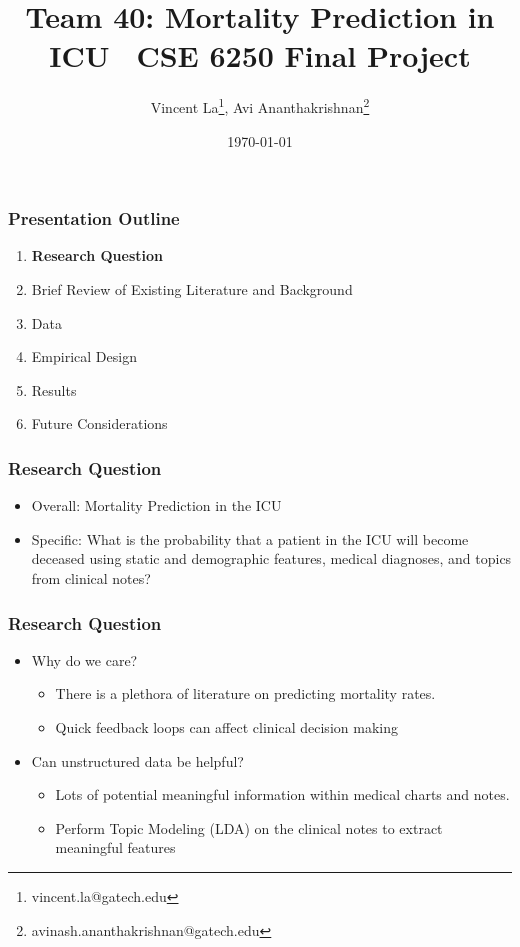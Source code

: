 \documentclass{beamer}
\title{Team 40: Mortality Prediction in ICU \ \newline CSE 6250 Final Project}
\author{Vincent La\footnote{vincent.la@gatech.edu}, Avi Ananthakrishnan\footnote{avinash.ananthakrishnan@gatech.edu}}
\institute{Georgia Tech}
\date{\today}
\begin{document}
\maketitle

\begin{frame}
\label{Presentation Outline 1}
\frametitle{Presentation Outline}
\begin{enumerate}
\item[1.] \textbf{Research Question}
\newline
\item[2.] Brief Review of Existing Literature and Background
\newline
\item[3.] Data
\newline
\item[4.] Empirical Design
\newline
\item[5.] Results
\newline
\item[6.] Future Considerations
\end{enumerate}
\end{frame}

\begin{frame}
\label{Research Question}
\frametitle{Research Question}
\begin{itemize}
	\item Overall: Mortality Prediction in the ICU
	\newline
	\item Specific: What is the probability that a patient in the ICU will become deceased using static and demographic features, medical diagnoses, and topics from clinical notes?
\end{itemize}
\end{frame}

\begin{frame} 
\frametitle{Research Question}
\begin{itemize}
	\item Why do we care?
	\newline
		\begin{itemize}
			\item There is a plethora of literature on predicting mortality rates.
			\item Quick feedback loops can affect clinical decision making
			\newline
		\end{itemize}
	\item Can unstructured data be helpful?
	\newline
		\begin{itemize}
			\item Lots of potential meaningful information within medical charts and notes.
			\item Perform Topic Modeling (LDA) on the clinical notes to extract meaningful features
		\end{itemize}
\end{itemize}
\end{frame}
\end{document}

